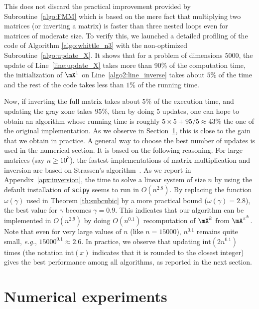 This does not discard the practical improvement provided by Subroutine~\ref{algo:FMM} which is based on the mere fact that multiplying  two matrices (or inverting a matrix) is faster than three nested loops even for matrices of moderate size. To verify this, we launched  a detailed profiling of the code of Algorithm \ref{algo:whittle_n3} with the non-optimized Subroutine~\ref{algo:update_X}. It shows that for a problem of dimensions $5000$, the update of Line~\ref{line:update_X} takes more than 90\% of the computation time, the initialization of $\mX^1$ on Line~\ref{algo2:line_inverse} takes about $5\%$ of the time and the rest of the code takes less than $1\%$ of the running time.

Now, if inverting the full matrix takes about $5\%$ of the execution time, and updating the gray zone takes $95\%$, then by doing $5$ updates, one can hope to obtain an algorithm whose running time is roughly $5\times5 + 95/5\approx43\%$ the one of the original implementation. As we observe in Section~\ref{sec:numerical}, this is close to the gain that we obtain in practice. A general way to choose the best number of updates is used in the numerical section. It is based on the following reasoning. For large matrices (say $n\ge 10^3$), the fastest implementations of matrix multiplication and inversion are based on Strassen's algorithm~\cite{huang2016strassen,huang2018practical}. As we report in Appendix~\ref{apx:inversion}, the time to solve a linear system of size $n$ by using the default installation of \texttt{scipy} seems to run in $O(n^{2.8})$. By replacing the function $\omega(\gamma)$ used in Theorem \ref{th:subcubic} by a more practical bound ($\omega(\gamma)=2.8$), the best value for $\gamma$ becomes $\gamma = 0.9$. This indicates that our algorithm can be implemented in $O(n^{2.9})$ by doing $O(n^{0.1})$ recomputation of $\mX^k$ from $\mA^{\pi^k}$. Note that even for very large values of $n$ (like $n=15000$), $n^{0.1}$ remains quite small, \emph{e.g.}, $15000^{0.1}\approx 2.6$. In practice, we observe that updating $\mathrm{int}(2n^{0.1})$ times (the notation $\mathrm{int}(x)$ indicates that it is rounded to the closest integer) gives the best performance among all algorithms, as reported in the next section.

\section{Numerical experiments}
\label{sec:numerical}

